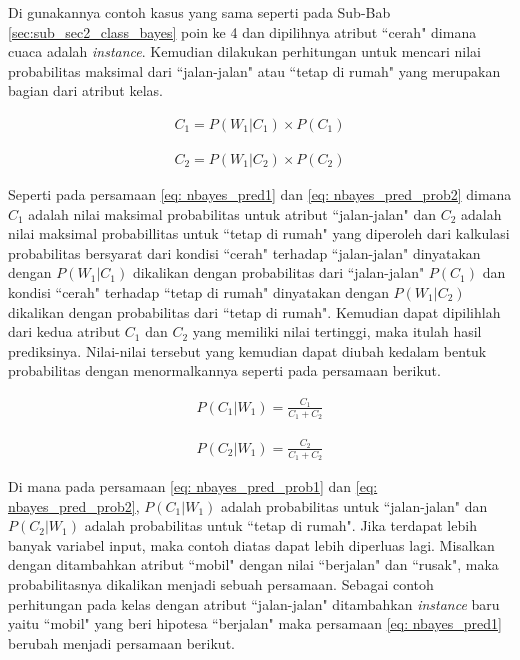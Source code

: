 \begin{subs}
\begin{enumerate}[label=\textbf{\arabic*).}]
		Di gunakannya contoh kasus yang sama seperti pada Sub-Bab \ref{sec:sub_sec2_class_bayes} poin ke 4 dan dipilihnya atribut ``cerah" dimana cuaca adalah \textit{instance}. Kemudian dilakukan perhitungan untuk mencari nilai probabilitas maksimal dari ``jalan-jalan" atau ``tetap di rumah" yang merupakan bagian dari atribut kelas.
	
		\begin{equation}\label{eq: nbayes_pred1}
		\begin{split}
		C_{1} = P(W_{1}|C_{1}) \times P(C_{1})
		\end{split}
		\end{equation}
		
		\begin{equation}\label{eq: nbayes_pred2}
		\begin{split}
		C_{2} = P(W_{1}|C_{2}) \times P(C_{2})
		\end{split}
		\end{equation}
	
		Seperti pada persamaan \ref{eq: nbayes_pred1} dan \ref{eq: nbayes_pred_prob2} dimana $C_{1}$ adalah nilai maksimal probabilitas untuk atribut ``jalan-jalan" dan $C_{2}$ adalah nilai maksimal probabillitas untuk ``tetap di rumah" yang diperoleh dari kalkulasi probabilitas bersyarat dari kondisi ``cerah" terhadap ``jalan-jalan" dinyatakan dengan $P(W_{1}|C_{1})$ dikalikan dengan probabilitas dari ``jalan-jalan" $P(C_{1})$ dan kondisi ``cerah" terhadap ``tetap di rumah" dinyatakan dengan $P(W_{1}|C_{2})$ dikalikan dengan probabilitas dari ``tetap di rumah". Kemudian dapat dipilihlah dari kedua atribut $C_{1}$ dan $C_{2}$ yang memiliki nilai tertinggi, maka itulah hasil prediksinya. Nilai-nilai tersebut yang kemudian dapat diubah kedalam bentuk probabilitas dengan menormalkannya seperti pada persamaan berikut.
	
		\begin{equation}\label{eq: nbayes_pred_prob1}
		\begin{split}
		P(C_{1}|W_{1}) = \frac{C_{1}}{C_{1} + C_{2}}
		\end{split}
		\end{equation}
		
		\begin{equation}\label{eq: nbayes_pred_prob2}
		\begin{split}
		P(C_{2}|W_{1}) = \frac{C_{2}}{C_{1} + C_{2}}
		\end{split}
		\end{equation}
	
		Di mana pada persamaan \ref{eq: nbayes_pred_prob1} dan \ref{eq: nbayes_pred_prob2}, $P(C_{1}|W_{1})$ adalah probabilitas untuk ``jalan-jalan" dan $P(C_{2}|W_{1})$ adalah probabilitas untuk ``tetap di rumah". Jika terdapat lebih banyak variabel input, maka contoh diatas dapat lebih diperluas lagi. Misalkan dengan ditambahkan atribut ``mobil" dengan nilai ``berjalan" dan ``rusak", maka probabilitasnya dikalikan menjadi sebuah persamaan. Sebagai contoh perhitungan pada kelas dengan atribut ``jalan-jalan" ditambahkan \textit{instance} baru yaitu ``mobil" yang beri hipotesa ``berjalan" maka persamaan \ref{eq: nbayes_pred1} berubah menjadi persamaan berikut.
	

\end{enumerate}
\end{subs}
